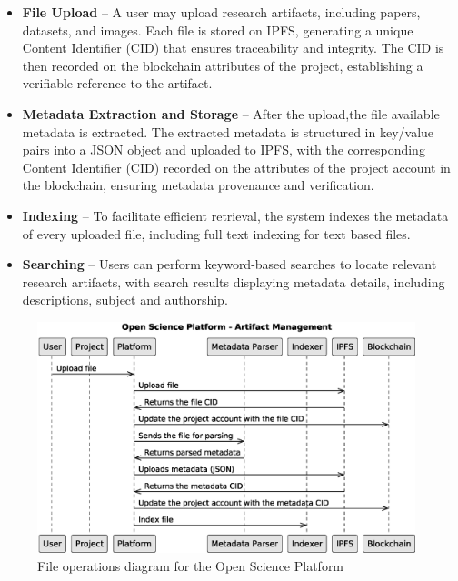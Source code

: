 \documentclass{article}
\begin{document}
\begin{itemize}
      \item \textbf{File Upload} – A user may upload research artifacts, including papers, datasets, and images. Each file is stored on IPFS, generating a unique Content Identifier (CID) that ensures traceability and integrity. The CID is then recorded on the blockchain attributes of the project, establishing a verifiable reference to the artifact.

      \item \textbf{Metadata Extraction and Storage} – After the upload,the file available metadata is extracted. The extracted metadata is structured in key/value pairs into a JSON object and uploaded to IPFS, with the corresponding Content Identifier (CID) recorded on the attributes of the project account in the blockchain, ensuring metadata provenance and verification.

      \item \textbf{Indexing} – To facilitate efficient retrieval, the system indexes the metadata of every uploaded file, including full text indexing for text based files.

      \item \textbf{Searching} – Users can perform keyword-based searches to locate relevant research artifacts, with search results displaying metadata details, including descriptions, subject and authorship.
\end{itemize}


\begin{figure}[htbp]
      \centering
      \includegraphics[width=0.98\textwidth, keepaspectratio]{c4_platform_operations_2}
      \caption{File operations diagram for the Open Science Platform}
      \label{fig:c4_file_operations_diagram}
\end{figure}
\end{document}
